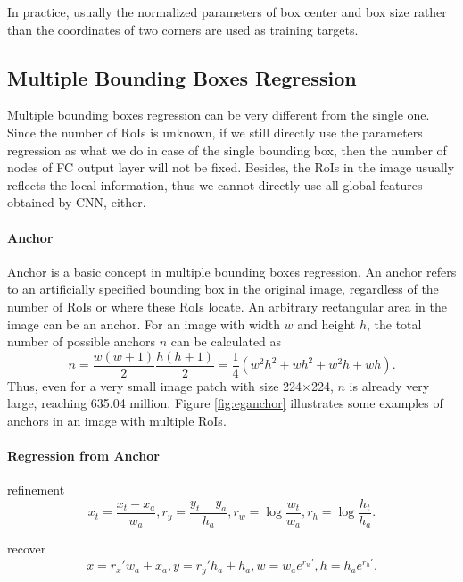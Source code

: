 

In practice, usually the normalized parameters of box center and box size rather than the coordinates of two corners are used as training targets.

\subsection{Multiple Bounding Boxes Regression}\label{mulbboxreg}

Multiple bounding boxes regression can be very different from the single one. Since the number of RoIs is unknown, if we still directly use the parameters regression as what we do in case of the single bounding box, then the number of nodes of FC output layer will not be fixed. Besides, the RoIs in the image usually reflects the local information, thus we cannot directly use all global features obtained by CNN, either.

\paragraph{Anchor}
Anchor is a basic concept in multiple bounding boxes regression. An anchor refers to an artificially specified bounding box in the original image, regardless of the number of RoIs or where these RoIs locate. An arbitrary rectangular area in the image can be an anchor. For an image with width $w$ and height $h$, the total number of possible anchors $n$ can be calculated as
\begin{equation}
	n = \frac{w(w+1)}{2}\frac{h(h+1)}{2} = \frac{1}{4}(w^2h^2+wh^2+w^2h+wh).
\end{equation}
Thus, even for a very small image patch with size 224$\times$224, $n$ is already very large, reaching 635.04 million. Figure \ref{fig:eganchor} illustrates some examples of anchors in an image with multiple RoIs.



\paragraph{Regression from Anchor}

refinement
\begin{equation}
	x_t = \frac{x_t - x_a}{w_a}, r_y = \frac{y_t - y_a}{h_a}, r_w = \log\frac{w_t}{w_a}, r_h = \log\frac{h_t}{h_a}.
\end{equation}

recover
\begin{equation}
	x = r_x'w_a + x_a, y = r_y'h_a + h_a, w = w_ae^{r_w'}, h = h_ae^{r_h'}.
\end{equation}



